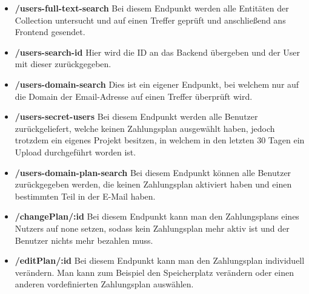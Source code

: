 \begin{itemize}
    \item \textbf{/users-full-text-search}
        \newline
        Bei diesem Endpunkt werden alle Entitäten der Collection untersucht und auf einen Treffer geprüft und anschließend ans Frontend gesendet.
    \item \textbf{/users-search-id}
        \newline
        Hier wird die ID an das Backend übergeben und der User mit dieser zurückgegeben.
    \item \textbf{/users-domain-search}
        \newline
        Dies ist ein eigener Endpunkt, bei welchem nur auf die Domain der Email-Adresse auf einen Treffer überprüft wird.
    \item \textbf{/users-secret-users}
        \newline
        Bei diesem Endpunkt werden alle Benutzer zurückgeliefert, welche keinen Zahlungsplan ausgewählt haben, jedoch trotzdem ein eigenes Projekt besitzen, in welchem in den letzten 30 Tagen ein Upload durchgeführt worden ist.
    \item \textbf{/users-domain-plan-search}
        \newline
        Bei diesem Endpunkt können alle Benutzer zurückgegeben werden, die keinen Zahlungsplan aktiviert haben und einen bestimmten Teil in der E-Mail haben.
    \item \textbf{/changePlan/:id}
        \newline
        Bei diesem Endpunkt kann man den Zahlungsplans eines Nutzers auf none setzen, sodass kein Zahlungsplan mehr aktiv ist und der Benutzer nichts mehr bezahlen muss.
    \item \textbf{/editPlan/:id}
        \newline
        Bei diesem Endpunkt kann man den Zahlungsplan individuell verändern. Man kann zum Beispiel den Speicherplatz verändern oder einen anderen vordefinierten Zahlungsplan auswählen.
\end{itemize}